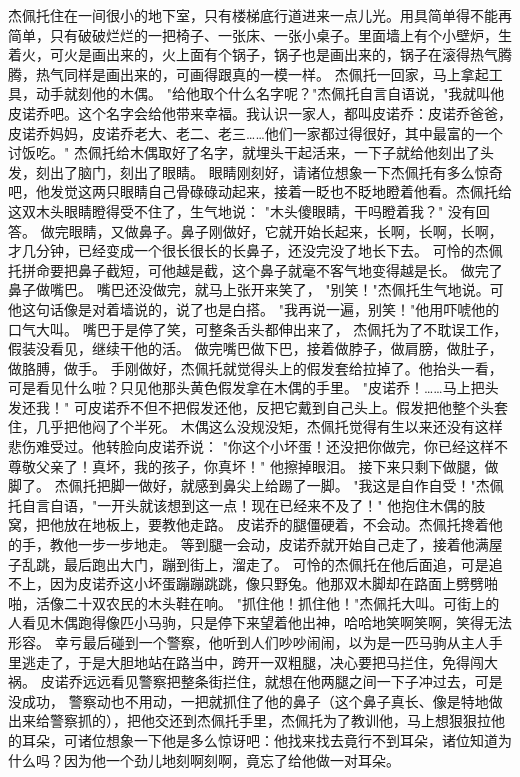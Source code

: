 \documentclass[12pt,UTF8]{ctexbook}
\begin{document}
杰佩托住在一间很小的地下室，只有楼梯底行道进来一点儿光。用具简单得不能再简单，只有破破烂烂的一把椅子、一张床、一张小桌子。里面墙上有个小壁炉，生着火，可火是画出来的，火上面有个锅子，锅子也是画出来的，锅子在滚得热气腾腾，热气同样是画出来的，可画得跟真的一模一样。
杰佩托一回家，马上拿起工具，动手就刻他的木偶。
"给他取个什么名字呢？"杰佩托自言自语说，"我就叫他皮诺乔吧。这个名字会给他带来幸福。我认识一家人，都叫皮诺乔：皮诺乔爸爸，皮诺乔妈妈，皮诺乔老大、老二、老三……他们一家都过得很好，其中最富的一个讨饭吃。"
杰佩托给木偶取好了名字，就埋头干起活来，一下子就给他刻出了头发，刻出了脑门，刻出了眼睛。
眼睛刚刻好，请诸位想象一下杰佩托有多么惊奇吧，他发觉这两只眼睛自己骨碌碌动起来，接着一眨也不眨地瞪着他看。杰佩托给这双木头眼睛瞪得受不住了，生气地说：
"木头傻眼睛，干吗瞪着我？"
没有回答。
做完眼睛，又做鼻子。鼻子刚做好，它就开始长起来，长啊，长啊，长啊，才几分钟，已经变成一个很长很长的长鼻子，还没完没了地长下去。
可怜的杰佩托拼命要把鼻子截短，可他越是截，这个鼻子就毫不客气地变得越是长。
做完了鼻子做嘴巴。
嘴巴还没做完，就马上张开来笑了，
"别笑！"杰佩托生气地说。可他这句话像是对着墙说的，说了也是白搭。
"我再说一遍，别笑！"他用吓唬他的口气大叫。
嘴巴于是停了笑，可整条舌头都伸出来了，
杰佩托为了不耽误工作，假装没看见，继续干他的活。
做完嘴巴做下巴，接着做脖子，做肩膀，做肚子，做胳膊，做手。
手刚做好，杰佩托就觉得头上的假发套给拉掉了。他抬头一看，可是看见什么啦？只见他那头黄色假发拿在木偶的手里。
"皮诺乔！……马上把头发还我！"
可皮诺乔不但不把假发还他，反把它戴到自己头上。假发把他整个头套住，几乎把他闷了个半死。
木偶这么没规没矩，杰佩托觉得有生以来还没有这样悲伤难受过。他转脸向皮诺乔说：
"你这个小坏蛋！还没把你做完，你已经这样不尊敬父亲了！真坏，我的孩子，你真坏！"
他擦掉眼泪。
接下来只剩下做腿，做脚了。
杰佩托把脚一做好，就感到鼻尖上给踢了一脚。
"我这是自作自受！"杰佩托自言自语，"一开头就该想到这一点！现在已经来不及了！"
他抱住木偶的肢窝，把他放在地板上，要教他走路。
皮诺乔的腿僵硬着，不会动。杰佩托搀着他的手，教他一步一步地走。
等到腿一会动，皮诺乔就开始自己走了，接着他满屋子乱跳，最后跑出大门，蹦到街上，溜走了。
可怜的杰佩托在他后面追，可是追不上，因为皮诺乔这小坏蛋蹦蹦跳跳，像只野兔。他那双木脚却在路面上劈劈啪啪，活像二十双农民的木头鞋在响。
"抓住他！抓住他！"杰佩托大叫。可街上的人看见木偶跑得像匹小马驹，只是停下来望着他出神，哈哈地笑啊笑啊，笑得无法形容。
幸亏最后碰到一个警察，他听到人们吵吵闹闹，以为是一匹马驹从主人手里逃走了，于是大胆地站在路当中，跨开一双粗腿，决心要把马拦住，免得闯大祸。
皮诺乔远远看见警察把整条街拦住，就想在他两腿之间一下子冲过去，可是没成功，
警察动也不用动，一把就抓住了他的鼻子（这个鼻子真长、像是特地做出来给警察抓的），把他交还到杰佩托手里，杰佩托为了教训他，马上想狠狠拉他的耳朵，可诸位想象一下他是多么惊讶吧：他找来找去竟行不到耳朵，诸位知道为什么吗？因为他一个劲儿地刻啊刻啊，竟忘了给他做一对耳朵。
\end{document}
